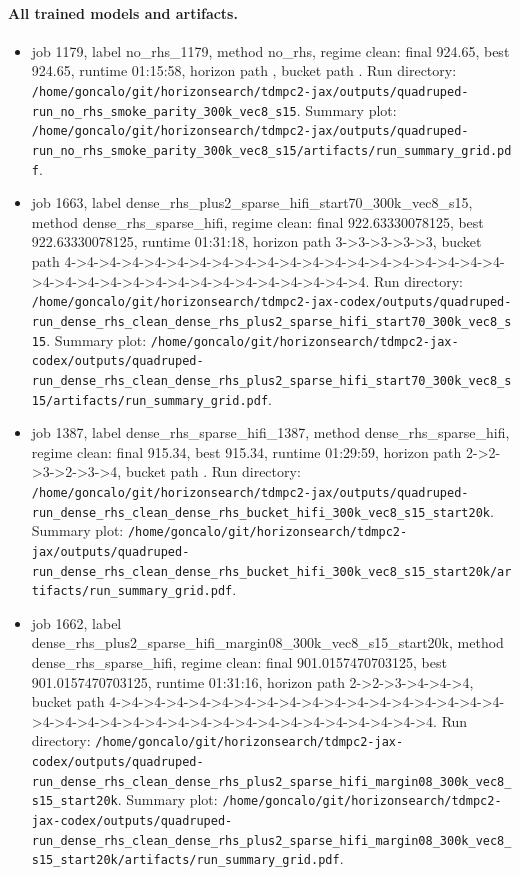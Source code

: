 \paragraph{All trained models and artifacts.}
\begin{itemize}
\item job 1179, label no\_rhs\_1179, method no\_rhs, regime clean: final 924.65, best 924.65, runtime 01:15:58, horizon path , bucket path . Run directory: \texttt{/home/goncalo/git/horizonsearch/tdmpc2-jax/outputs/quadruped-run\_no\_rhs\_smoke\_parity\_300k\_vec8\_s15}. Summary plot: \texttt{/home/goncalo/git/horizonsearch/tdmpc2-jax/outputs/quadruped-run\_no\_rhs\_smoke\_parity\_300k\_vec8\_s15/artifacts/run\_summary\_grid.pdf}.
\item job 1663, label dense\_rhs\_plus2\_sparse\_hifi\_start70\_300k\_vec8\_s15, method dense\_rhs\_sparse\_hifi, regime clean: final 922.63330078125, best 922.63330078125, runtime 01:31:18, horizon path 3->3->3->3->3, bucket path 4->4->4->4->4->4->4->4->4->4->4->4->4->4->4->4->4->4->4->4->4->4->4->4->4->4->4->4->4->4->4->4->4->4->4. Run directory: \texttt{/home/goncalo/git/horizonsearch/tdmpc2-jax-codex/outputs/quadruped-run\_dense\_rhs\_clean\_dense\_rhs\_plus2\_sparse\_hifi\_start70\_300k\_vec8\_s15}. Summary plot: \texttt{/home/goncalo/git/horizonsearch/tdmpc2-jax-codex/outputs/quadruped-run\_dense\_rhs\_clean\_dense\_rhs\_plus2\_sparse\_hifi\_start70\_300k\_vec8\_s15/artifacts/run\_summary\_grid.pdf}.
\item job 1387, label dense\_rhs\_sparse\_hifi\_1387, method dense\_rhs\_sparse\_hifi, regime clean: final 915.34, best 915.34, runtime 01:29:59, horizon path 2->2->3->2->3->4, bucket path . Run directory: \texttt{/home/goncalo/git/horizonsearch/tdmpc2-jax/outputs/quadruped-run\_dense\_rhs\_clean\_dense\_rhs\_bucket\_hifi\_300k\_vec8\_s15\_start20k}. Summary plot: \texttt{/home/goncalo/git/horizonsearch/tdmpc2-jax/outputs/quadruped-run\_dense\_rhs\_clean\_dense\_rhs\_bucket\_hifi\_300k\_vec8\_s15\_start20k/artifacts/run\_summary\_grid.pdf}.
\item job 1662, label dense\_rhs\_plus2\_sparse\_hifi\_margin08\_300k\_vec8\_s15\_start20k, method dense\_rhs\_sparse\_hifi, regime clean: final 901.0157470703125, best 901.0157470703125, runtime 01:31:16, horizon path 2->2->3->4->4->4, bucket path 4->4->4->4->4->4->4->4->4->4->4->4->4->4->4->4->4->4->4->4->4->4->4->4->4->4->4->4->4->4->4->4->4->4->4->4. Run directory: \texttt{/home/goncalo/git/horizonsearch/tdmpc2-jax-codex/outputs/quadruped-run\_dense\_rhs\_clean\_dense\_rhs\_plus2\_sparse\_hifi\_margin08\_300k\_vec8\_s15\_start20k}. Summary plot: \texttt{/home/goncalo/git/horizonsearch/tdmpc2-jax-codex/outputs/quadruped-run\_dense\_rhs\_clean\_dense\_rhs\_plus2\_sparse\_hifi\_margin08\_300k\_vec8\_s15\_start20k/artifacts/run\_summary\_grid.pdf}.

\end{itemize}
